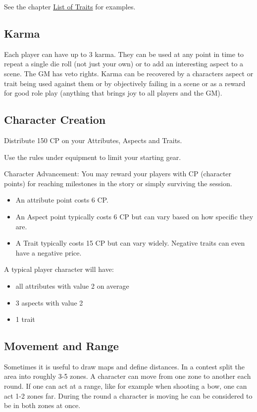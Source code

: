 \documentclass[11pt]{article}
\begin{document}
{See the chapter \hyperref[sec:org8237ddc]{List of Traits} for examples.

\subsection{Karma}
\label{sec:org4f44048}
\begin{short}
Each player can have up to 3 karma. They can be used at any point in time to repeat a single die roll (not just your own) or to add an interesting aspect to a scene. The GM has veto rights. Karma can be recovered by a characters aspect or trait being used against them or by objectively failing in a scene or as a reward for good role play (anything that brings joy to all players and the GM). 
\end{short}


\subsection{Character Creation}
\label{sec:org472b2c9}
\begin{short}
Distribute 150 CP on your Attributes, Aspects and Traits.

Use the rules under equipment to limit your starting gear.

Character Advancement:
You may reward your players with CP (character points) for reaching milestones in the story or simply surviving the session.

\begin{itemize}
\item An attribute point costs 6 CP.
\item An Aspect point typically costs 6 CP but can vary based on how specific they are.
\item A Trait typically costs 15 CP but can vary widely. Negative traits can even have a negative price.
\end{itemize}

A typical player character will have:
\begin{itemize}
\item all attributes with value 2 on average
\item 3 aspects with value 2
\item 1 trait
\end{itemize}
\end{short}

\subsection{Movement and Range}
\label{sec:org047f236}
\begin{short}
Sometimes it is useful to draw maps and define distances. In a contest split the area into roughly 3-5 zones. A character can move from one zone to another each round. If one can act at a range, like for example when shooting a bow, one can act 1-2 zones far. During the round a character is moving he can be considered to be in both zones at once.
\end{short}

}
\end{document}
